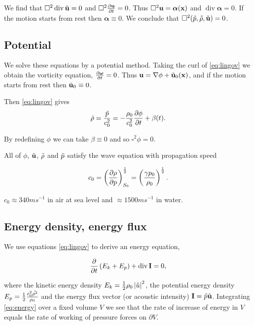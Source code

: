 \documentclass{notes}
\newcommand{\bs}[1]{\boldsymbol{#1}}
\renewcommand{\Box}{\square}
\DeclareMathOperator{\dive}{div}
\begin{document}
We find that $\Box^2 \dive \Tilde{\vu} = 0$ and 
$\Box^2 \pddt{\vu} = 0$.  Thus $\Box^2 \vu = \bs{\alpha}(\vx)$ 
and $\dive \bs{\alpha} = 0$.  If the motion starts from rest then
$\bs{\alpha} \equiv 0$.  We conclude that
$\Box^2 (\Tilde{p}, \Tilde{\rho}, \Tilde{\vu}) = 0$.

\subsection{Potential}

We solve these equations by a potential method.  Taking the curl
of \eqref{eq:lingov} we obtain the vorticity equation,
$\pddt{\bs{\omega}} = 0$.  Thus $\mathbf{u} = \nabla \phi + \Tilde{\mathbf{u}}_0(\mathbf{x})$,
and if the motion starts from rest then $\Tilde{\mathbf{u}}_0 \equiv 0$.

Then \eqref{eq:lingov} gives
\[
\Tilde{\rho} = \frac{\Tilde{p}}{c_0^2} = - \frac{\rho_0}{c_0^2}
\frac{\partial \phi}{\partial t} + \beta(t).
\]

By redefining $\phi$ we can take $\beta \equiv 0$ and so $\Box^2 \phi = 0$.

All of $\phi$, $\Tilde{\mathbf{u}}$, $\Tilde{\rho}$ and $\Tilde{p}$
satisfy the wave equation with propagation speed

\begin{equation}\label{eq:wavespeed}
c_0 = \left( \frac{\partial \rho}{\partial p} \right)^{\frac{1}{2}}_{S_0}
= \left( \frac{\gamma p_0}{\rho_0} \right)^{\frac{1}{2}}.
\end{equation}

$c_0 \approx 340 ms^{-1}$ in air at sea level and $\approx 1500 ms^{-1}$
in water.

\subsection{Energy density, energy flux}

We use equations \eqref{eq:lingov} to derive an energy equation,

\begin{equation}\label{eq:energy}
\pddt{} \left( E_k + E_p \right)  + \dive \vect{I} = 0,
\end{equation}

where the kinetic energy density $E_k = \tfrac{1}{2} \rho_0
\left|\Tilde{u}\right|^2$, the potential energy density
$E_p = \tfrac{1}{2} \frac{c_0^2 \Tilde{\rho^2}}{\rho_0}$
and the energy flux vector (or acoustic intensity)
$\mathbf{I} = \Tilde{p} \Tilde{\mathbf{u}}$.  Integrating \eqref{eq:energy}
over a fixed volume $V$ we see that the rate of increase of
energy in $V$ equals the rate of working of pressure forces on $\partial V$.
\end{document}

